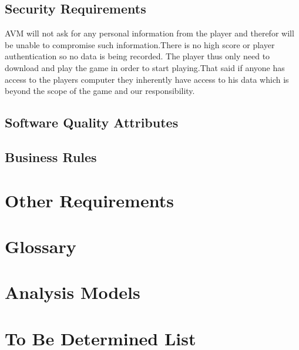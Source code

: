 \section{Security Requirements}
AVM will not ask for any personal information from the player and therefor will be unable to compromise such information.There is no high score or  player authentication so no data is being recorded. The player thus only need to download and play the game in order to start playing.That said if anyone has access to the players computer they inherently have access to his data which is beyond the scope of the game and our responsibility.
\section{Software Quality Attributes}

\section{Business Rules}

\chapter{Other Requirements}
\label{Other Requirements}

\begin{appendices}
\chapter{Glossary}
\chapter{Analysis Models}
\chapter{To Be Determined List}


\end{appendices}


